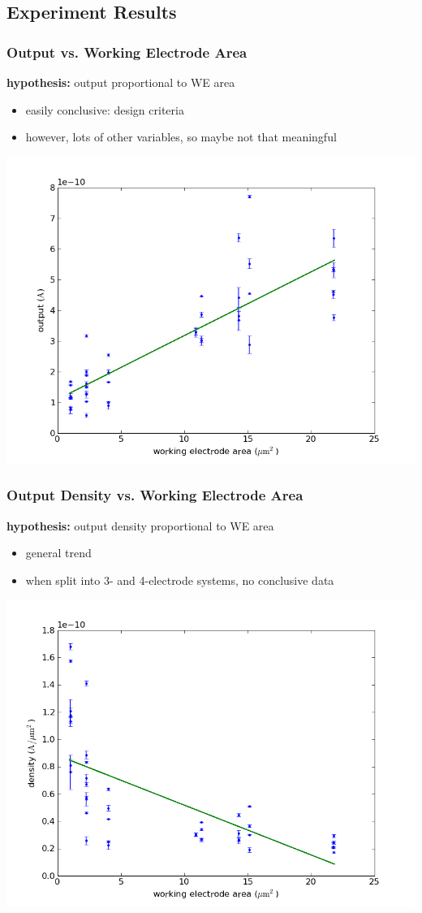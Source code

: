 \documentclass[10pt]{beamer}
\begin{document}
\subsection{Experiment Results}
\begin{frame}
	\frametitle{Output vs. Working Electrode Area}
	\textbf{hypothesis:} output proportional to WE area
	\begin{itemize}
		\item easily conclusive: design criteria
		\item however, lots of other variables, so maybe not that meaningful
	\end{itemize}
	\includegraphics[width=0.8\linewidth]{figures/area_v_output.png}
\end{frame}

\begin{frame}
	\frametitle{Output Density vs. Working Electrode Area}
	\textbf{hypothesis:} output density proportional to WE area
	\begin{itemize}
		\item general trend
		\item when split into 3- and 4-electrode systems, no conclusive data
	\end{itemize}
	\includegraphics[width=0.8\linewidth]{figures/area_v_density.png}
\end{frame}
\end{document}
